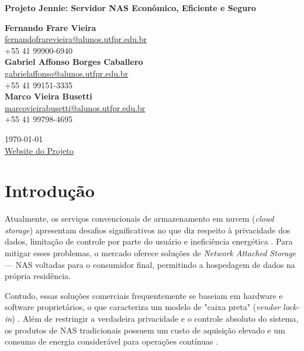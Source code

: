 \documentclass[a4paper,12pt]{article}
\date{\today}
\begin{document}
  

\vspace{1em}  
\begin{center}  
    \Large\textbf{Projeto Jennie: Servidor NAS Econômico, Eficiente e Seguro} \\
\end{center} 
\vspace{1em}  

\begin{center}  
    \textbf{Fernando Frare Vieira} \\  
    \href{mailto:fernandofrarevieira@alunos.utfpr.edu.br}{fernandofrarevieira@alunos.utfpr.edu.br} \\  
    +55 41 99900-6940 \\[1.5em]  
    \textbf{Gabriel Affonso Borges Caballero} \\  
    \href{mailto:gabrielaffonso@alunos.utfpr.edu.br}{gabrielaffonso@alunos.utfpr.edu.br} \\  
    +55 41 99151-3335\\[1.5em]  
    \textbf{Marco Vieira Busetti} \\  
    \href{mailto:marcovieirabusetti@alunos.utfpr.edu.br}{marcovieirabusetti@alunos.utfpr.edu.br} \\  
    +55 41 99798-4695  
\end{center}  

\vspace{1em}
\begin{center}  
    \today  \\[1cm]
    \href{https://www.notion.so/JENNIE-NAS-Open-Source-330dca6860fa807d94e1dabd933a0dda}{Website do Projeto}
\end{center}
\vspace{2em}

\section{Introdução}  
Atualmente, os serviços convencionais de armazenamento em nuvem (\textit{cloud storage}) apresentam desafios significativos no que diz respeito à privacidade dos dados, limitação de controle por parte do usuário e ineficiência energética \cite{zissis2012}. Para mitigar esses problemas, o mercado oferece soluções de \textit{Network Attached Storage} --- NAS voltadas para o consumidor final, permitindo a hospedagem de dados na própria residência. 

Contudo, essas soluções comerciais frequentemente se baseiam em hardware e software proprietários, o que caracteriza um modelo de "caixa preta" (\textit{vendor lock-in}) \cite{shapiro1999}. Além de restringir a verdadeira privacidade e o controle absoluto do sistema, os produtos de NAS tradicionais possuem um custo de aquisição elevado e um consumo de energia considerável para operações contínuas \cite{berl2010}.
\end{document}
